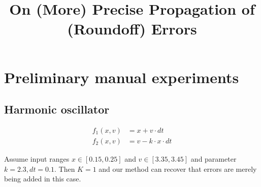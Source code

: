 \documentclass[10pt]{article}
\title{On (More) Precise Propagation of (Roundoff) Errors}
\author{}
\newcommand{\eqn}[1]{
 \begin{align} #1
 \end{align}}
\begin{document}
\maketitle








\section{Preliminary manual experiments}

\subsection{Harmonic oscillator}
\eqn{
  f_1(x, v) &= x + v \cdot dt\\
  f_2(x, v) &= v - k \cdot x \cdot dt
}

Assume input ranges $x \in [0.15, 0.25]$ and $v \in [3.35, 3.45]$
and parameter $k = 2.3, dt = 0.1$.
Then $K = 1$ and our method can recover that errors are merely being added in this case.
\end{document}
